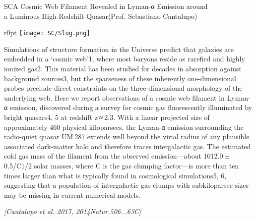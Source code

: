 \begin{section}{SC}{A Cosmic Web Filament Revealed in Lyman-α Emission around \\
    \hspace*{4cm} a Luminous High-Redshift Quasar}{(Prof. Sebastiano Cantalupo)}
  \begin{minipage}{\linewidth}
    \begin{wrapfigure}{r}{0pt}
      \texttt{[image: SC/Slug.png]}
    \end{wrapfigure}
    \strut {\small Simulations of structure formation in the Universe
      predict that galaxies are embedded in a ‘cosmic web’1, where most
      baryons reside as rarefied and highly ionized gas2. This material has
      been studied for decades in absorption against background sources3,
      but the sparseness of these inherently one-dimensional probes preclude
      direct constraints on the three-dimensional morphology of the
      underlying web. Here we report observations of a cosmic web filament
      in Lyman-α emission, discovered during a survey for cosmic gas
      fluorescently illuminated by bright quasars4, 5 at redshift z ≈ 2.3.
      With a linear projected size of approximately 460 physical
      kiloparsecs, the Lyman-α emission surrounding the radio-quiet quasar
      UM 287 extends well beyond the virial radius of any plausible
      associated dark-matter halo and therefore traces intergalactic gas.
      The estimated cold gas mass of the filament from the observed
      emission—about 1012.0 ± 0.5/C1/2 solar masses, where C is the gas
      clumping factor—is more than ten times larger than what is typically
      found in cosmological simulations5, 6, suggesting that a population of
      intergalactic gas clumps with subkiloparsec sizes may be missing in
      current numerical models.}
  \end{minipage}

  \vspace{0.7cm}

  {\footnotesize \textit{[Cantalupo et al. 2017, 2014Natur.506...63C]}}
\end{section}